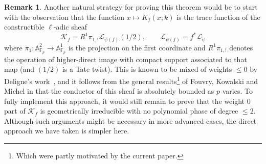 \documentclass[12pt,a4paper,reqno]{amsart}
\numberwithin{equation}{section}
\newcommand{\FT}{\mathrm{FT}}
\theoremstyle{plain}
\theoremstyle{definition}
\newtheorem{remark}[theorem]{Remark}
\newcommand\F{\mathbb{F}}
\newcommand\rk{\mathrm{rk}}
\newcommand\mcG{\mathcal{G}}
\newcommand\mcK{\mathcal{K}}
\newcommand\mcL{\mathcal{L}}
\newcommand\Af{\mathbb{A}^1}
\newcommand\Aa{\mathbb{A}}
\newcommand\Fp{\F_{p}}
\begin{document}
\begin{remark} Another natural strategy for proving this theorem would
  be to start with the observation that the function $x\mapsto
  K_f(x;k)$ is the trace function of the constructible $\ell$-adic
  sheaf
$$
\mcK_f=R^1\pi_{1,!}\mcL_{\psi(f)}(1/2),\quad\quad
\mcL_{\psi(f)}=f^*\mcL_\psi
$$
where $\pi_1:\Aa_{\Fp}^2\to \Af_{\Fp}$ is the projection on the
first coordinate and $R^1\pi_{1,!}$ denotes the operation of
higher-direct image with compact support associated to that map (and
$(1/2)$ is a Tate twist). This is known to be mixed of weights $\leq
0$ by Deligne's work~\cite{WeilII}, and it follows from the general
results\footnote{Which were partly motivated by the current paper.} of
Fouvry, Kowalski and Michel in \cite{transforms} that the conductor of
this sheaf is absolutely bounded as $p$ varies. To fully implement
this approach, it would still remain to prove that the weight $0$ part
of $\mcK_f$ is geometrically irreducible with no polynomial phase of
degree $\leq 2$.  Although such arguments might be necessary in more
advanced cases, the direct approach we have taken is simpler here.
\end{remark}

\end{document}
